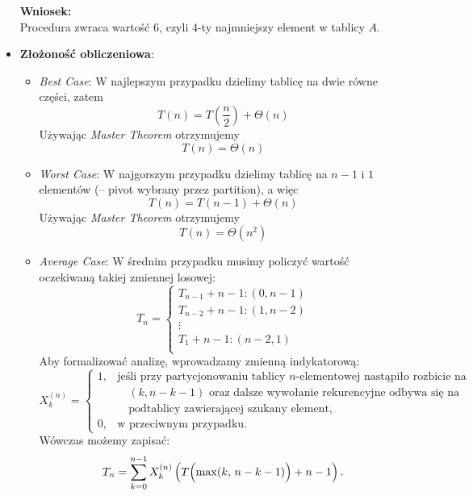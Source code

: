 \documentclass[11pt,a4paper]{article}
\begin{document}
\begin{itemize}
        \bigskip

        \textbf{Wniosek:}\\
        Procedura zwraca wartość $\boxed{6}$, czyli 4-ty najmniejszy element w tablicy $A$.
    \item \textbf{Złożoność obliczeniowa}:
        \begin{itemize}
            \item \textit{Best Case}:
                W najlepszym przypadku dzielimy tablicę na dwie równe części, zatem
                \[
                    T(n) = T\left(\frac{n}{2}\right) + \Theta(n)
                \]
                Używając \textit{Master Theorem} otrzymujemy
                \[
                    T(n) = \Theta(n)
                \]
            \item \textit{Worst Case}:
                W najgorszym przypadku dzielimy tablicę na $n-1$ i $1$ elementów (-- pivot wybrany przez partition), a więc
                \[
                    T(n) = T(n-1) + \Theta(n)
                \]
                Używając \textit{Master Theorem} otrzymujemy
                \[
                    T(n) = \Theta(n^2)
                \]
            \item \textit{Average Case}:
                W średnim przypadku musimy policzyć wartość oczekiwaną takiej zmiennej losowej:
                \[
                    T_n = \begin{cases}
                        T_{n-1} + n-1: (0, n-1) \\
                        T_{n-2} + n-1: (1, n-2) \\
                        \vdots \\
                        T_1 + n-1: (n-2, 1) \\
                    \end{cases}
                \]
                Aby formalizować analizę, wprowadzamy zmienną indykatorową:
                \[
                    X^{(n)}_k =
                    \begin{cases}
                        1, & \text{jeśli przy partycjonowaniu tablicy $n$-elementowej nastąpiło rozbicie na } \\
                           & \quad (k, n-k-1) \text{ oraz dalsze wywołanie rekurencyjne odbywa się na} \\
                           & \quad \text{podtablicy zawierającej szukany element,} \\
                        0, & \text{w przeciwnym przypadku.}
                    \end{cases}
                \]
                Wówczas możemy zapisać:
                \[
                    T_n = \sum_{k=0}^{n-1} X^{(n)}_k \left( T\Bigl(\max(k,\, n-k-1)\Bigr) + n-1 \right).
                \]


\end{itemize}
\end{itemize}
\end{document}
